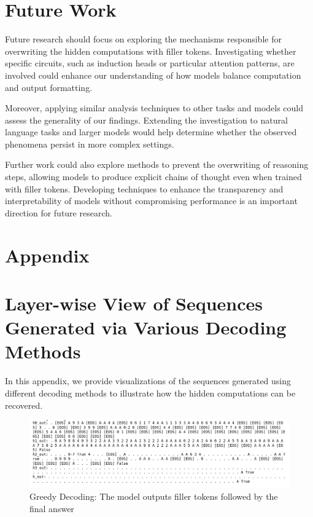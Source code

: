 \documentclass{article}
\begin{document}
\section{Future Work}

Future research should focus on exploring the mechanisms responsible for overwriting the hidden computations with filler tokens. Investigating whether specific circuits, such as induction heads or particular attention patterns, are involved could enhance our understanding of how models balance computation and output formatting.

Moreover, applying similar analysis techniques to other tasks and models could assess the generality of our findings. Extending the investigation to natural language tasks and larger models would help determine whether the observed phenomena persist in more complex settings.

Further work could also explore methods to prevent the overwriting of reasoning steps, allowing models to produce explicit chains of thought even when trained with filler tokens. Developing techniques to enhance the transparency and interpretability of models without compromising performance is an important direction for future research.

\section*{Appendix}

\section{Layer-wise View of Sequences Generated via Various Decoding Methods}

In this appendix, we provide visualizations of the sequences generated using different decoding methods to illustrate how the hidden computations can be recovered.

\begin{figure}[H]
    \centering
    \includegraphics[width=\textwidth]{greedy_decoding.png}
    \caption{Greedy Decoding: The model outputs filler tokens followed by the final answer}
    \label{fig:greedy}
\end{figure}
\end{document}
